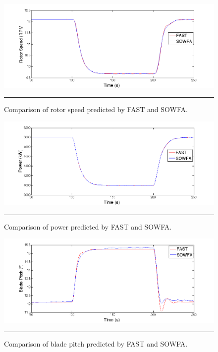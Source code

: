 \begin{figure}[htbp]
	\centering
		\includegraphics[trim = {1cm 0 2cm 0}, clip, width = \linewidth]{Figures/ch6Figures/fig6-2.png}
		\rule{35em}{0.5pt}
	\caption{Comparison of rotor speed predicted by FAST and SOWFA.}
	\label{fig6-2}
\end{figure}

\begin{figure}[htbp]
	\centering
		\includegraphics[trim = {1cm 0 2cm 0}, clip, width = \linewidth]{Figures/ch6Figures/fig6-3.png}
		\rule{35em}{0.5pt}
	\caption{Comparison of power predicted by FAST and SOWFA.}
	\label{fig6-3}
\end{figure}

\begin{figure}[htbp]
	\centering
		\includegraphics[trim = {1cm 0 2cm 0}, clip, width = \linewidth]{Figures/ch6Figures/fig6-4.png}
		\rule{35em}{0.5pt}
	\caption{Comparison of blade pitch predicted by FAST and SOWFA.}
	\label{fig6-4}
\end{figure}

